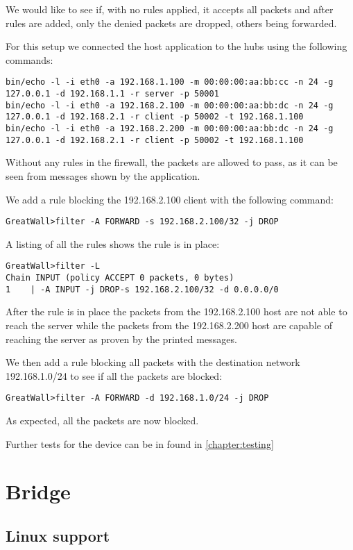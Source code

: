 We would like to see if, with no rules applied, it accepts all packets and after rules are added, only the denied packets
are dropped, others being forwarded.

For this setup we connected the host application to the hubs using the following commands:
\begin{lstlisting}
bin/echo -l -i eth0 -a 192.168.1.100 -m 00:00:00:aa:bb:cc -n 24 -g 127.0.0.1 -d 192.168.1.1 -r server -p 50001
bin/echo -l -i eth0 -a 192.168.2.100 -m 00:00:00:aa:bb:dc -n 24 -g 127.0.0.1 -d 192.168.2.1 -r client -p 50002 -t 192.168.1.100
bin/echo -l -i eth0 -a 192.168.2.200 -m 00:00:00:aa:bb:dc -n 24 -g 127.0.0.1 -d 192.168.2.1 -r client -p 50002 -t 192.168.1.100
\end{lstlisting}
Without any rules in the firewall, the packets are allowed to pass, as it can be seen from messages shown by the application.

We add a rule blocking the 192.168.2.100 client with the following command:
\begin{lstlisting}
GreatWall>filter -A FORWARD -s 192.168.2.100/32 -j DROP
\end{lstlisting}
A listing of all the rules shows the rule is in place:
\begin{lstlisting}
GreatWall>filter -L
Chain INPUT (policy ACCEPT 0 packets, 0 bytes)
1	 | -A INPUT -j DROP-s 192.168.2.100/32 -d 0.0.0.0/0
\end{lstlisting}
After the rule is in place the packets from the 192.168.2.100 host are not able to reach the server while the packets from
the 192.168.2.200 host are capable of reaching the server as proven by the printed messages.

We then add a rule blocking all packets with the destination network 192.168.1.0/24 to see if all the packets are blocked:
\begin{lstlisting}
GreatWall>filter -A FORWARD -d 192.168.1.0/24 -j DROP
\end{lstlisting}
As expected, all the packets are now blocked.

Further tests for the device can be in found in \ref{chapter:testing}

\section{Bridge}

\subsection{Linux support}
\label{sub-sec:bridge-lin}

